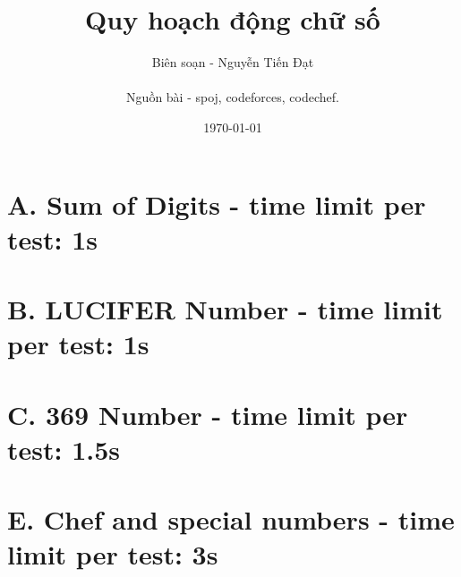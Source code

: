 \documentclass[a4paper,17pt]{article}
\title{Quy hoạch động chữ số}
\author{
    Biên soạn - Nguyễn Tiến Đạt \\ \\
    Nguồn bài - spoj, codeforces, codechef.
}
\date{\today}
\begin{document}
    \maketitle
    \newpage
    \tableofcontents
    \newpage
    \section{\textbf{A. Sum of Digits - time limit per test: 1s}}
        
    \section{\textbf{B. LUCIFER Number - time limit per test: 1s}}
        
    \section{\textbf{C. 369 Number - time limit per test: 1.5s}}
        
    \section{\textbf{E. Chef and special numbers - time limit per test: 3s}}
        
\end{document}

